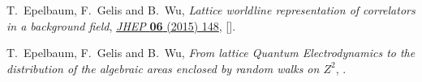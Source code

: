 \documentclass[onecolumn,showpacs,nobibnotes,nofootinbib,12pt,aps,prd,showpacs,notitlepage,nofootinbib,preprintnumbers,amsmath,amssymb]{article}
\begin{document}
\begin{thebibliography}{10}
T.~Epelbaum, F.~Gelis and B.~Wu, \emph{{Lattice worldline representation of
  correlators in a background field}},
  \href{https://doi.org/10.1007/JHEP06(2015)148}{\emph{JHEP} {\bfseries 06}
  (2015) 148}, [\href{https://arxiv.org/abs/1503.05333}{{}}].

T.~Epelbaum, F.~Gelis and B.~Wu, \emph{{From lattice Quantum Electrodynamics to
  the distribution of the algebraic areas enclosed by random walks on $Z^2$}},
  \href{https://arxiv.org/abs/1504.00314}{{}}.

\end{thebibliography}\endgroup
  
\end{document}
